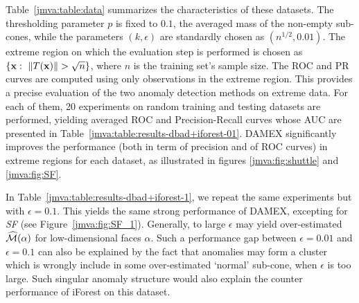 Table~\ref{jmva:table:data} summarizes the characteristics of these
datasets. 
The thresholding parameter $p$ is fixed to $0.1$, the averaged mass of the non-empty sub-cones, while the parameters $(k,\epsilon)$ are standardly chosen as $(n^{1/2}, 0.01)$.
The extreme region on which the evaluation step is performed is chosen
as $\{\mathbf x:~ \|T(\mathbf x)\| > \sqrt{n} \}$, where $n$ is the  training
set's sample size. The ROC and PR curves are computed using only observations in the extreme region. This provides a precise evaluation of the two anomaly detection methods on extreme data.
For each of them, 20 experiments on random training and testing datasets are performed, yielding averaged ROC and Precision-Recall curves whose AUC are presented in Table~\ref{jmva:table:results-dbad+iforest-01}.
%
DAMEX significantly improves the performance (both in term of precision and of ROC curves) in extreme regions
for each dataset, as illustrated in figures \ref{jmva:fig:shuttle} and \ref{jmva:fig:SF}.

In Table~\ref{jmva:table:results-dbad+iforest-1}, we repeat the same experiments but with $\epsilon=0.1$.
This yields the same strong performance of DAMEX, excepting for \emph{SF} (see Figure~\ref{jmva:fig:SF_1}).
Generally, to large $\epsilon$ may yield over-estimated
$\widehat{\mathcal{M}}(\alpha)$ for low-dimensional faces $\alpha$.
Such a performance gap between $\epsilon=0.01$ and $\epsilon=0.1$ can also be explained by the fact that anomalies may form a cluster which is wrongly include in some over-estimated `normal' sub-cone, when $\epsilon$ is too large. Such singular anomaly structure would also explain the counter performance of iForest on this dataset.


%

